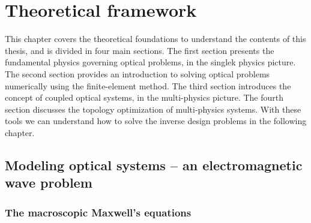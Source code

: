 \chapter{Theoretical framework}

This chapter covers the theoretical foundations to understand the contents of this thesis, 
and is divided in four main sections. The first section presents the fundamental physics
governing optical problems, in the singlek physics picture. The second section provides 
an introduction to solving optical problems numerically using the finite-element method.
The third section introduces the concept of coupled optical systems, in the multi-physics
picture. The fourth section discusses the topology optimization of multi-physics systems.
With these tools we can understand how to solve the inverse design problems in the following
chapter.






\section{Modeling optical systems -- an electromagnetic wave problem}

\subsection*{The macroscopic Maxwell's equations}

